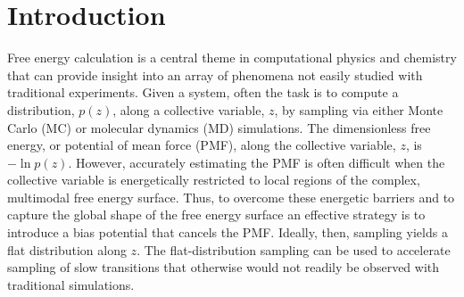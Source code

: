 \documentclass[reprint, superscriptaddress, floatfix]{revtex4-1}
\begin{document}
\maketitle



\section{Introduction}



Free energy calculation\cite{frenkel, newman} is a central theme
in computational physics and chemistry
that can provide insight into an array of phenomena not easily studied
with traditional experiments.
%
Given a system,
often the task is to compute
a distribution, $p(z)$,
along a collective variable, $z$, by sampling via either Monte Carlo\cite{
  frenkel, newman, landau_binder} (MC)
or molecular dynamics\cite{frenkel, karplus2002} (MD) simulations.
%
The dimensionless free energy, or potential of mean force (PMF),
along the collective variable, $z$,
is $-\ln p(z)$.
%
However, accurately estimating the PMF is often difficult
when the collective variable is energetically restricted to local regions
of the complex, multimodal free energy surface.
%
Thus,
to overcome these energetic barriers and
to capture the global shape of the free energy surface
an effective strategy is to introduce a bias potential that
cancels the PMF.
%
Ideally, then, sampling yields a flat distribution
along $z$\cite{mezei1987, berg1992, *lee1993,
wang2001, wang2001pre,
huber1994,
*laio2002, *laio2008, *barducci2011, *sutto2012}.
%
The flat-distribution sampling can be used to accelerate
sampling of slow transitions that otherwise would not readily
be observed with traditional simulations.
%
\end{document}

